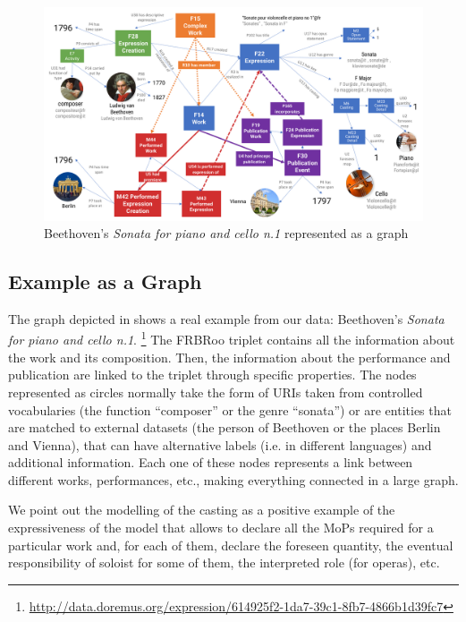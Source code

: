\begin{figure}
 \centerline{
 \includegraphics[width=\textwidth]{figs/schema_2.png}}
 \caption{Beethoven's \textit{Sonata for piano and cello n.1} represented as a graph}
 \label{fig:schema}
\end{figure}

\subsection{Example as a Graph}
The graph depicted in  shows a real example from our data: Beethoven's \textit{Sonata for piano and cello n.1}. \footnote{\url{http://data.doremus.org/expression/614925f2-1da7-39c1-8fb7-4866b1d39fc7}} The FRBRoo triplet contains all the information about the work and its composition. Then, the information about the performance and publication are linked to the triplet through specific properties. The nodes represented as circles normally take the form of URIs taken from controlled vocabularies (the function ``composer'' or the genre ``sonata'') or are entities that are matched to external datasets (the person of Beethoven or the places Berlin and Vienna), that can have alternative labels (i.e. in different languages) and additional information. Each one of these nodes represents a link between different works, performances, etc., making everything connected in a large graph.

We point out the modelling of the casting as a positive example of the expressiveness of the model that allows to declare all the MoPs required for a particular work and, for each of them, declare the foreseen quantity, the eventual responsibility of soloist for some of them, the interpreted role (for operas), etc.

